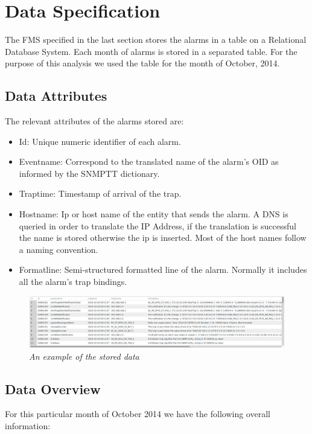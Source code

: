 \documentclass[10pt,a4paper]{report}
\begin{document}
 
\chapter{Data Specification}

The FMS specified in the last section stores the alarms in a table on a Relational Database System. Each month of alarms is stored in a separated table. For the purpose of this analysis we used the table for the month of October, 2014.

\section{Data Attributes}

The relevant attributes of the alarms stored are:

\begin{itemize}
  \item Id: Unique numeric identifier of each alarm.
  \item Eventname: Correspond to the translated name of the alarm's OID as informed by the SNMPTT dictionary.
  \item Traptime: Timestamp of arrival of the trap.
  \item Hostname: Ip or host name of the entity that sends the alarm. A DNS is queried in order to translate the IP Address, if the translation is successful the name is stored otherwise the ip is inserted. Most of the host names follow a naming convention.
  \item Formatline: Semi-structured formatted line of the alarm. Normally it includes all the alarm's trap bindings.
\end{itemize}

\begin{figure}[H]
 \includegraphics[scale=0.4]{alarms_db_sample.png}
  \centering
  \caption{\textit{An example of the stored data}}
  \label{fig:acc_dataexample}
\end{figure}	

\section{Data Overview} 
For this particular month of October 2014 we have the following overall information:
\end{document}
